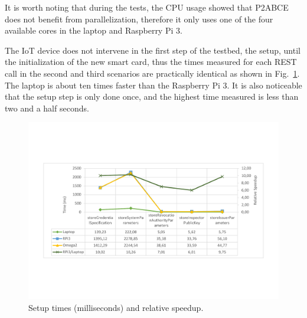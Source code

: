 It is worth noting that during the tests, the CPU usage showed that P2ABCE does not benefit from parallelization, therefore it only uses one of the four available cores in the laptop and Raspberry Pi 3.

\hfil

The IoT device does not intervene in the first step of the testbed, the setup, until the initialization of the new smart card, thus the times measured for each REST call in the second and third scenarios are practically identical as shown in Fig.~\ref{fig:setup:graph}. The laptop is about ten times faster than the Raspberry Pi 3. It is also noticeable that the setup step is only done once, and the highest time measured is less than two and a half seconds.

\begin{figure}[bth]
	\centering
	\includegraphics[width=\linewidth]{gfx/graphics/SetupGraphTable}
	\caption{Setup times (milliseconds) and relative speedup.}
	\label{fig:setup:graph}
\end{figure}




\hfil

